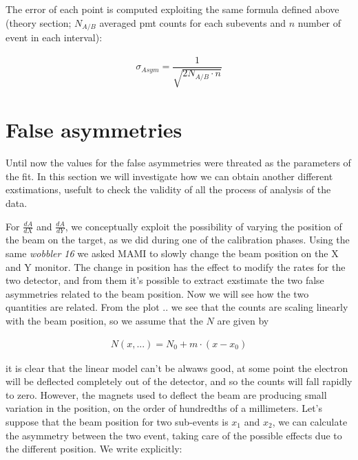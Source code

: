 The error of each point is computed exploiting the same formula defined above (theory section; $N_{A/B}$ averaged pmt counts for each subevents and $n$ number of event in each interval):

\begin{align*}
\sigma_{Asym} = \dfrac{1}{\sqrt{2N_{A/B} \cdot n}}
\end{align*}


\section{False asymmetries}

Until now the values for the false asymmetries were threated as the parameters of the fit. In this section we will investigate how we can obtain another different exstimations, usefult to check the validity of all the process of analysis of the data.

For $\frac{dA}{dX}$ and $\frac{dA}{dY}$, we conceptually exploit the possibility of varying the position of the beam on the target, as we did during one of the calibration phases. Using the same \textit{wobbler 16} we asked MAMI to slowly change the beam position on the X and Y monitor. The change in position has the effect to modify the rates for the two detector, and from them it's possible to extract exstimate the two false asymmetries related to the beam position. Now we will see how the two quantities are related.
From the plot .. we see that the counts are scaling linearly with the beam position, so we assume that the $N$ are given by

\begin{align*}
N(x,...) = N_{0} + m \cdot (x - x_{0})
\end{align*}

it is clear that the linear model can't be alwaws good, at some point the electron will be deflected completely out of the detector, and so the counts will fall rapidly to zero. However, the magnets used to deflect the beam are producing small variation in the position, on the order of hundredths of a millimeters.
Let's suppose that the beam position for two sub-events is $x_{1}$ and $x_{2}$, we can calculate the asymmetry between the two event, taking care of the possible effects due to the different position. We write explicitly: 

